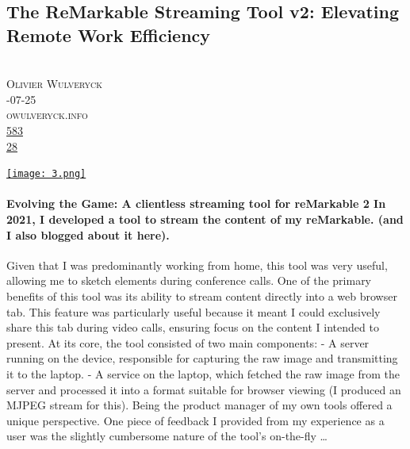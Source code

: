 \documentclass[10pt,a4paper]{article}
\begin{document}
\subsection{The ReMarkable Streaming Tool v2: Elevating Remote Work Efficiency}
\noindent\begin{minipage}[t]{0.19\linewidth}
\vspace{0pt}
\noindent\scshape\footnotesize
\\ {\scriptsize\faUser}\space 
Olivier Wulveryck
\\ {\scriptsize\faCalendar}-07-25
\\ {\scriptsize\faGlobe}\space 
owulveryck.info
\\ {\scriptsize\faThumbsOUp}\space 
\href{http://news.ycombinator.com/item?id=37196440\&utm\_term=comment}{583} 
\\ {\scriptsize\faComments}\space 
\href{http://news.ycombinator.com/item?id=37196440\&utm\_term=comment}{28} 
\end{minipage} 
\begin{minipage}[t]{0.80\linewidth}
\vspace{0pt}
\begin{multicols}{2}
    \href{https://blog.owulveryck.info/2023/07/25/evolving-the-game-a-clientless-streaming-tool-for-remarkable-2.html?utm\_source=hackernewsletter\&utm\_medium=email\&utm\_term=fav}{
        \texttt{[image: 3.png]}
    }
\paragraph{Evolving the Game: A clientless streaming tool for reMarkable 2
In 2021, I developed a tool to stream the content of my reMarkable. (and I also blogged about it here).}
 Given that I was predominantly working from home, this tool was very useful, allowing me to sketch elements during conference calls.
One of the primary benefits of this tool was its ability to stream content directly into a web browser tab. This feature was particularly useful because it meant I could exclusively share this tab during video calls, ensuring focus on the content I intended to present.
At its core, the tool consisted of two main components:
- A server running on the device, responsible for capturing the raw image and transmitting it to the laptop.
- A service on the laptop, which fetched the raw image from the server and processed it into a format suitable for browser viewing (I produced an MJPEG stream for this).
Being the product manager of my own tools offered a unique perspective. One piece of feedback I provided from my experience as a user was the slightly cumbersome nature of the tool’s on-the-fly 
\dots
\end{multicols}
\end{minipage}
\par\medskip
\end{document}
